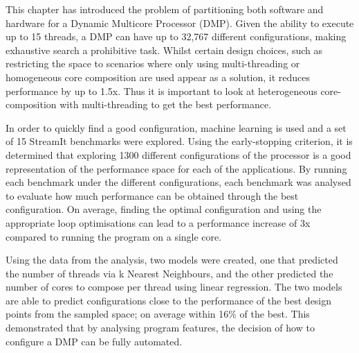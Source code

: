 This chapter has introduced the problem of partitioning both software and hardware for a Dynamic Multicore Processor (DMP).
Given the ability to execute up to 15 threads, a DMP can have up to 32,767 different configurations, making exhaustive search a prohibitive task.
Whilst certain design choices, such as restricting the space to scenarios where only using multi-threading or homogeneous core composition are used appear as a solution, it reduces performance by up to 1.5x.
Thus it is important to look at heterogeneous core-composition with multi-threading to get the best performance.

In order to quickly find a good configuration, machine learning is used and a set of 15 StreamIt benchmarks were explored.
Using the early-stopping criterion, it is determined that exploring 1300 different configurations of the processor is a good representation of the performance space for each of the applications.
By running each benchmark under the different configurations, each benchmark was analysed to evaluate how much performance can be obtained through the best configuration.
On average, finding the optimal configuration and using the appropriate loop optimisations can lead to a performance increase of 3x compared to running the program on a single core.

Using the data from the analysis, two models were created, one that predicted the number of threads via k Nearest Neighbours, and the other predicted the number of cores to compose per thread using linear regression.
The two models are able to predict configurations close to the performance of the best design points from the sampled space; on average within 16\% of the best.
This demonstrated that by analysing program features, the decision of how to configure a DMP can be fully automated.

